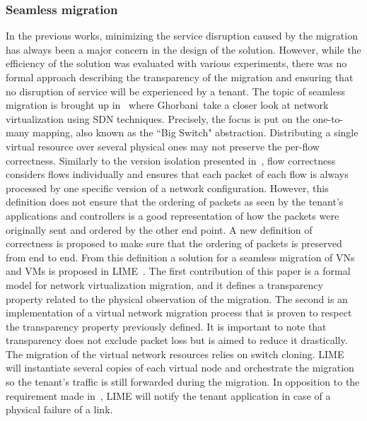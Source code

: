 \subsubsection{Seamless migration}
In the previous works, minimizing the service disruption caused by the migration has always been a major concern in the design of the solution. However, while the efficiency of the solution was evaluated with various experiments, there was no formal approach describing the transparency of the migration and ensuring that no disruption of service will be experienced by a tenant.
The topic of seamless migration is brought up in~\cite{toward-Ghorbani2014} where Ghorbani~\etal take a closer look at network virtualization using SDN techniques.
Precisely, the focus is put on the one-to-many mapping, also known as the ``Big Switch" abstraction.
Distributing a single virtual resource over several physical ones may not preserve the per-flow correctness.
Similarly to the version isolation presented in~\cite{Liu2015a}, flow correctness considers flows individually and ensures that each packet of each flow  is always processed by one specific version of a network configuration. 
However, this definition does not ensure that the ordering of packets as seen by the tenant's applications and controllers is a good representation of how the packets were originally sent and ordered by the other end point.
A new definition of correctness is proposed to make sure that the ordering of packets is preserved from end to end.
From this definition  a solution for a seamless migration of VNs and VMs is proposed in LIME~\cite{Lime-Ghorbani2014}.
The first contribution of this paper is a formal model for network virtualization migration, and it defines a transparency property related to the physical observation of the migration.
The second is an implementation of a virtual network migration process that is proven to respect the transparency property previously defined.
It is important to note that transparency does not exclude packet loss but is aimed to reduce it drastically.
The migration of the virtual network resources relies on switch cloning.
LIME will instantiate several copies of each virtual node and orchestrate the migration so the tenant's traffic is still forwarded during the migration.
In opposition to the requirement made in~\cite{Ko2017c}, LIME will notify the tenant application in case of a physical failure of a link.
